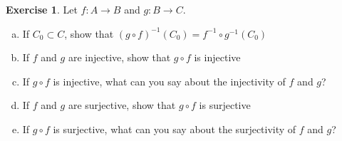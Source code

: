 \documentclass[11pt,a4paper,twoside]{article}
\theoremstyle{definition}
\newcounter{excounter}
\newtheorem{exercise}[excounter]{Exercise}
\begin{document}
\begin{exercise}
  Let $f : A \to B$ and $g : B \to C$.
  \begin{enumerate}[(a)]
    \item If $C_0 \subset C$, show that $\left(  g \circ f \right)^{-1} (C_0) = f^{-1} \circ g^{-1} (C_0)$
    \item If $f$ and $g$ are injective, show that $g \circ f$ is injective
    \item If $g \circ f$ is injective, what can you say about the injectivity of $f$ and $g$?
    \item If $f$ and $g$ are surjective, show that $g \circ f$ is surjective
    \item If $g \circ f$ is surjective, what can you say about the surjectivity of $f$ and $g$?
  \end{enumerate}
\end{exercise}
\end{document}
